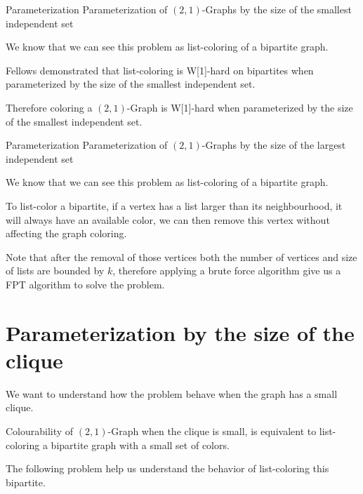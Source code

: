 \documentclass[9pt, compress]{beamer}
\newcommand{\?}{\textcolor{warn}{\textit{?}}}
\begin{document}
    \begin{frame}{Parameterization}
      \large{Parameterization of $(2,1)$-Graphs by the size of the smallest independent set}
      \normalsize\newline\newline
            
      We know that we can see this problem as list-coloring of a bipartite graph.
      
      Fellows demonstrated that list-coloring is W[1]-hard on bipartites when parameterized by the size of the smallest independent set.\cite{fellows07}
      
      Therefore coloring a $(2,1)$-Graph is W[1]-hard when parameterized by the size of the smallest independent set.
    \end{frame}
    \begin{frame}{Parameterization}
    \large{Parameterization of $(2,1)$-Graphs by the size of the largest independent set}
      \normalsize\newline\newline
            
      We know that we can see this problem as list-coloring of a bipartite graph.
      
      To list-color a bipartite, if a vertex has a list larger than its neighbourhood, it will always have an available color, we can then remove this vertex without affecting the graph coloring.
      
      Note that after the removal of those vertices both the number of vertices and size of lists are bounded by $k$,  therefore applying a brute force algorithm give us a FPT algorithm to solve the problem.
     \end{frame}
     
    \section{Parameterization by the size of the clique}
     \begin{frame}
       We want to understand how the problem behave when the graph has a small clique.
       
       Colourability of $(2,1)$-Graph when the clique is small, is equivalent to list-coloring a bipartite graph with a small set of colors.
       
       The following problem help us understand the behavior of list-coloring this bipartite.
     \end{frame}
    
\end{document}
